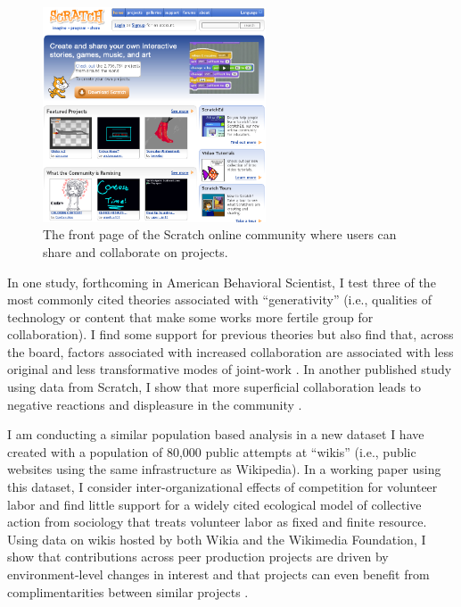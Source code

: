 \documentclass[10pt]{memoir}
\begin{document}
\begin{figure}
 \begin{centering}
 \includegraphics[width=2.6in]{figures/frontpage_modified-topremix.png}
  \caption{The front page of the Scratch online community where users
    can share and collaborate on projects.}
 \label{fig:scratchfrontpage}
 \end{centering}
 \vspace{-2em}
\end{figure}

In one study, forthcoming in American Behavioral Scientist, I test
three of the most commonly cited theories associated with
``generativity'' (i.e., qualities of technology or content that make
some works more fertile group for collaboration). I find some support
for previous theories but also find that, across the board, factors
associated with increased collaboration are associated with less
original and less transformative modes of joint-work
\cite{hill_remixing_2012}. In another published study using data from
Scratch, I show that more superficial collaboration leads to negative
reactions and displeasure in the community
\cite{hill_responses_2010}.

I am conducting a similar population based analysis in a new dataset I
have created with a population of 80,000 public attempts at ``wikis''
(i.e., public websites using the same infrastructure as Wikipedia). In
a working paper using this dataset, I consider inter-organizational
effects of competition for volunteer labor and find little support for
a widely cited ecological model of collective action from sociology
that treats volunteer labor as fixed and finite resource. Using data
on wikis hosted by both Wikia and the Wikimedia Foundation, I show
that contributions across peer production projects are driven by
environment-level changes in interest and that projects can even
benefit from complimentarities between similar projects
\cite{hill_is_2012}.
\end{document}
